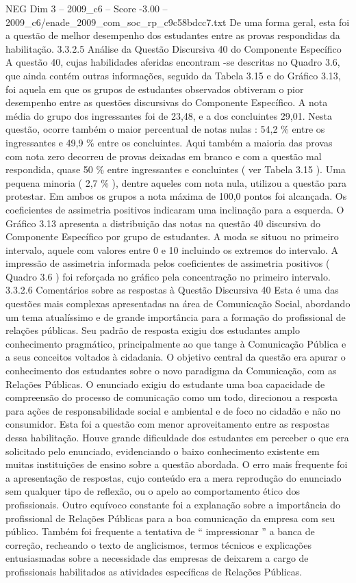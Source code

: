 \begin{textsample}{NEG Dim 3 – 2009\_c6 – Score -3.00 – 2009\_c6/enade\_2009\_com\_soc\_rp\_c9c58bdcc7.txt}
De uma forma geral, esta foi a questão de melhor desempenho dos estudantes entre as provas respondidas da habilitação. 3.3.2.5 Análise da Questão Discursiva 40 do Componente Específico A questão 40, cujas habilidades aferidas encontram -se descritas no Quadro 3.6, que ainda contém outras informações, seguido da Tabela 3.15 e do Gráfico 3.13, foi aquela em que os grupos de estudantes observados obtiveram o pior desempenho entre as questões discursivas do Componente Específico.
A nota média do grupo dos ingressantes foi de 23,48, e a dos concluintes 29,01.
Nesta questão, ocorre também o maior percentual de notas nulas : 54,2 \% entre os ingressantes e 49,9 \% entre os concluintes.
Aqui também a maioria das provas com nota zero decorreu de provas deixadas em branco e com a questão mal respondida, quase 50 \% entre ingressantes e concluintes ( ver Tabela 3.15 ).
Uma pequena minoria ( 2,7 \% ), dentre aqueles com nota nula, utilizou a questão para protestar.
Em ambos os grupos a nota máxima de 100,0 pontos foi alcançada.
Os coeficientes de assimetria positivos indicaram uma inclinação para a esquerda.
O Gráfico 3.13 apresenta a distribuição das notas na questão 40 discursiva do Componente Específico por grupo de estudantes.
A moda se situou no primeiro intervalo, aquele com valores entre 0 e 10 incluindo os extremos do intervalo.
A impressão de assimetria informada pelos coeficientes de assimetria positivos ( Quadro 3.6 ) foi reforçada no gráfico pela concentração no primeiro intervalo. 3.3.2.6 Comentários sobre as respostas à Questão Discursiva 40 Esta é uma das questões mais complexas apresentadas na área de Comunicação Social, abordando um tema atualíssimo e de grande importância para a formação do profissional de relações públicas.
Seu padrão de resposta exigiu dos estudantes amplo conhecimento pragmático, principalmente ao que tange à Comunicação Pública e a seus conceitos voltados à cidadania.
O objetivo central da questão era apurar o conhecimento dos estudantes sobre o novo paradigma da Comunicação, com as Relações Públicas.
O enunciado exigiu do estudante uma boa capacidade de compreensão do processo de comunicação como um todo, direcionou a resposta para ações de responsabilidade social e ambiental e de foco no cidadão e não no consumidor.
Esta foi a questão com menor aproveitamento entre as respostas dessa habilitação.
Houve grande dificuldade dos estudantes em perceber o que era solicitado pelo enunciado, evidenciando o baixo conhecimento existente em muitas instituições de ensino sobre a questão abordada.
O erro mais frequente foi a apresentação de respostas, cujo conteúdo era a mera reprodução do enunciado sem qualquer tipo de reflexão, ou o apelo ao comportamento ético dos profissionais.
Outro equívoco constante foi a explanação sobre a importância do profissional de Relações Públicas para a boa comunicação da empresa com seu público.
Também foi frequente a tentativa de “ impressionar ” a banca de correção, recheando o texto de anglicismos, termos técnicos e explicações entusiasmadas sobre a necessidade das empresas de deixarem a cargo de profissionais habilitados as atividades específicas de Relações Públicas.

\end{textsample}
